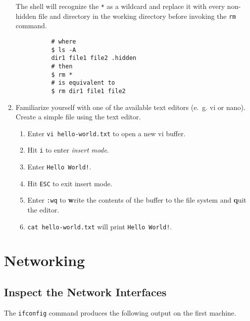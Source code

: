 \begin{enumerate}
        The shell will recognize the \texttt{*} as a wildcard and replace it with every non-hidden file and directory in the working directory before invoking the \texttt{rm} command.

        \begin{verbatim}
          # where
          $ ls -A
          dir1 file1 file2 .hidden
          # then
          $ rm *
          # is equivalent to
          $ rm dir1 file1 file2
        \end{verbatim}

  \item Familiarize yourself with one of the available text editors (e.~g. vi or nano). Create a simple file using the text editor.

        \begin{enumerate}
          \item Enter \texttt{vi hello-world.txt} to open a new vi buffer.
          \item Hit \texttt{i} to enter \emph{insert mode}.
          \item Enter \texttt{Hello World!}.
          \item Hit \texttt{ESC} to exit insert mode.
          \item Enter \texttt{:wq} to \textbf{w}rite the contents of the buffer to the file system and \textbf{q}uit the editor.
          \item \texttt{cat hello-world.txt} will print \texttt{Hello World!}.
        \end{enumerate}
\end{enumerate}

\section{Networking}

\subsection{Inspect the Network Interfaces}

The \texttt{ifconfig} command produces the following output on the first machine.

